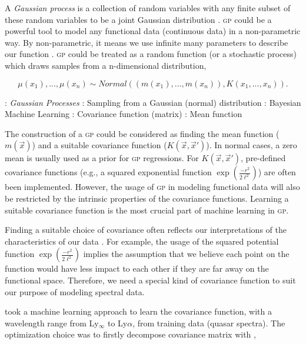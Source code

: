 \documentclass{ar-1col}
\begin{document}
A {\it Gaussian process} is a collection of random variables with any finite subset of these random variables to be a joint Gaussian distribution \citep{Rasmussen2005}. \textsc{gp} could be a powerful tool to model any functional data (continuous data) in a non-parametric way. 
By non-parametric, it means we use infinite many parameters to describe our function \citep{Gelman04}. \textsc{gp} could be treated as a random function (or a stochastic process) which draws samples from a n-dimensional distribution, 

\begin{equation}
    \mu(x_1), ..., \mu(x_n) \sim Normal((m(x_1), ..., m(x_n)), K(x_1, ..., x_n)).
    \label{eq:GP}
\end{equation}

\begin{marginnote}[120pt]
    : \textit{Gaussian Processes}
    : Sampling from a Gaussian (normal) distribution
    : Bayesian Machine Learning    
    : Covariance function (matrix)
    \entry{$\mu$}: Mean function
\end{marginnote} 

The construction of a \textsc{gp} could be considered as finding the mean function ($m(\vec x)$) and a suitable covariance function ($K(\vec x, \vec x')$). 
In normal cases, a zero mean is usually used as a prior for \textsc{gp} regressions. For $K(\vec x, \vec x')$, pre-defined covariance functions (e.g., a squared exponential function $\exp{(\frac{-r^2}{2 \ell^2})}$) are often been implemented. 
However, the usage of \textsc{gp} in modeling functional data will also be restricted by the intrinsic properties of the covariance functions.
Learning a suitable covariance function is the most crucial part of machine learning in \textsc{gp}.

Finding a suitable choice of covariance often reflects our interpretations of the characteristics of our data  \citep{Rasmussen2005}. 
For example, the usage of the squared potential function $\exp{(\frac{-r^2}{2 \ell^2})}$ implies the assumption that we believe each point on the function would have less impact to each other if they are far away on the functional space.
Therefore, we need a special kind of covariance function to suit our purpose of modeling spectral data.

\citet{Garnett17} took a machine learning approach to learn the covariance function, with a wavelength range from Ly$_\infty$ to Ly$\alpha$, from training data (quasar spectra). 
The optimization choice was to firstly decompose covariance matrix with \citep{Garnett2015},
\end{document}
